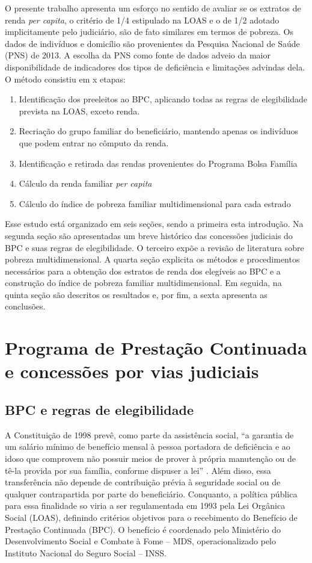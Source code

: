 \documentclass[
	12pt,				%
	openright,			%
	twoside,			%
	a4paper,			%
	english,			%
	french,				%
	spanish,			%
	brazil				%
	]{abntex2}
\begin{document}
O presente trabalho apresenta um esforço no sentido de avaliar se os extratos de renda \textit{per capita}, o critério de 1/4 estipulado na LOAS e o de 1/2 adotado implicitamente pelo judiciário, são de fato similares em termos de pobreza. Os dados de indivíduos e domicílio são provenientes da Pesquisa Nacional de Saúde (PNS) de 2013. A escolha da PNS como fonte de dados adveio da maior disponibilidade de indicadores dos tipos de deficiência e limitações advindas dela. O método consistiu em x etapas:

\begin{enumerate}
	\item Identificação dos preeleitos ao BPC, aplicando todas as regras de elegibilidade prevista na LOAS, exceto renda.
	\item Recriação do grupo familiar do beneficiário, mantendo apenas os indivíduos que podem entrar no cômputo da renda.
	\item Identificação e retirada das rendas provenientes do Programa Bolsa Família
	\item Cálculo da renda familiar \textit{per capita}
	\item Cálculo do índice de pobreza familiar multidimensional para cada estrado
\end{enumerate}

Esse estudo está organizado em seis seções, sendo a primeira esta introdução. Na segunda seção são apresentadas um breve histórico das concessões judiciais do BPC e suas regras de elegibilidade. O terceiro expõe a revisão de literatura sobre pobreza multidimensional. A quarta seção explicita os métodos e procedimentos necessários para a obtenção dos estratos de renda dos elegíveis ao BPC e a construção do índice de pobreza familiar multidimensional. Em seguida, na quinta seção são descritos os resultados e, por fim, a sexta apresenta as conclusões. 


\chapter{Programa de Prestação Continuada e concessões por vias judiciais}

	\section{BPC e regras de elegibilidade }
A Constituição de 1998 prevê, como parte da assistência social, ``a garantia de um salário mínimo de benefício mensal à pessoa portadora de deficiência e ao idoso que comprovem não possuir meios de prover à própria manutenção ou de tê-la provida por sua família, conforme dispuser a lei'' \cite[Art. 203, inciso V]{brasil1988}. Além disso, essa transferência não depende de contribuição prévia à seguridade social ou de qualquer contrapartida por parte do beneficiário. Conquanto, a política pública para essa finalidade so viria a ser regulamentada em 1993 pela Lei Orgânica Social (LOAS), definindo critérios objetivos para o recebimento do Benefício de Prestação Continuada (BPC). O benefício é coordenado pelo Ministério do Desenvolvimento Social e Combate à Fome -- MDS, operacionalizado pelo Instituto Nacional do Seguro Social -- INSS.
\end{document}
